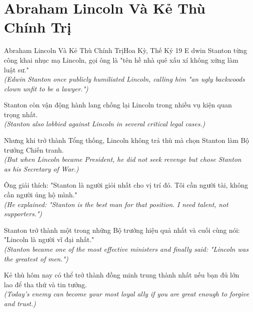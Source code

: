 \section{Abraham Lincoln Và Kẻ Thù Chính Trị}
\begin{truyen}{Abraham Lincoln Và Kẻ Thù Chính Trị}{Hoa Kỳ, Thế Kỷ 19}
E dwin Stanton từng công khai nhục mạ Lincoln, gọi ông là "tên hề nhà quê xấu xí không xứng làm luật sư."\\
\textit{(Edwin Stanton once publicly humiliated Lincoln, calling him "an ugly backwoods clown unfit to be a lawyer.")}

Stanton còn vận động hành lang chống lại Lincoln trong nhiều vụ kiện quan trọng nhất.\\
\textit{(Stanton also lobbied against Lincoln in several critical legal cases.)}

Nhưng khi trở thành Tổng thống, Lincoln không trả thù mà chọn Stanton làm Bộ trưởng Chiến tranh.\\
\textit{(But when Lincoln became President, he did not seek revenge but chose Stanton as his Secretary of War.)}

Ông giải thích: "Stanton là người giỏi nhất cho vị trí đó. Tôi cần người tài, không cần người ủng hộ mình."\\
\textit{(He explained: "Stanton is the best man for that position. I need talent, not supporters.")}

Stanton trở thành một trong những Bộ trưởng hiệu quả nhất và cuối cùng nói: "Lincoln là người vĩ đại nhất."\\
\textit{(Stanton became one of the most effective ministers and finally said: "Lincoln was the greatest of men.")}

\end{truyen}
\begin{baihoc}
  Kẻ thù hôm nay có thể trở thành đồng minh trung thành nhất nếu bạn đủ lớn lao để tha thứ và tin tưởng.\\
  \textit{(Today's enemy can become your most loyal ally if you are great enough to forgive and trust.)}
\end{baihoc}

